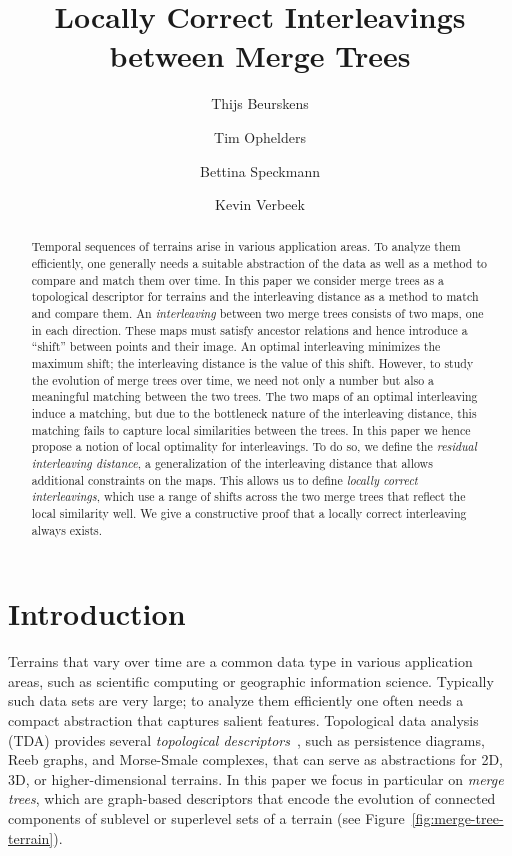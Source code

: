 \documentclass[a4paper,UKenglish, autoref, thm-restate, cleveref]{lipics-v2021}
\title{Locally Correct Interleavings between Merge Trees}
\author{Thijs Beurskens}{Department of Mathematics and Computer Science, TU Eindhoven, The Netherlands}{t.p.j.beurskens@tue.nl}{https://orcid.org/0009-0004-1185-1545}{Supported by the Dutch Research Council (NWO) under project no. OCENW.M20.089.}
\author{Tim Ophelders}{Department of Information and Computing Science, Utrecht University, The Netherlands \and Department of Mathematics and Computer Science, TU Eindhoven, The Netherlands}{t.a.e.ophelders@uu.nl}{https://orcid.org/0000-0002-9570-024X}{Supported by the Dutch Research Council (NWO) under project no. VI.Veni.212.260.}
\author{Bettina Speckmann}{Department of Mathematics and Computer Science, TU Eindhoven, The Netherlands}{b.speckmann@tue.nl}{https://orcid.org/0000-0002-8514-7858}{}
\author{Kevin Verbeek}{Department of Mathematics and Computer Science, TU Eindhoven, The Netherlands}{k.a.b.verbeek@tue.nl}{https://orcid.org/0000-0003-3052-4844}{}
\begin{document}
\maketitle

\begin{abstract}
Temporal sequences of terrains arise in various application areas. To analyze them efficiently, one generally needs a suitable abstraction of the data as well as a method to compare and match them over time. In this paper we consider merge trees as a topological descriptor for terrains and the interleaving distance as a method to match and compare them. An \emph{interleaving} between two merge trees consists of two maps, one in each direction. These maps must satisfy ancestor relations and hence introduce a ``shift'' between points and their image. An optimal interleaving minimizes the maximum shift; the interleaving distance is the value of this shift. However, to study the evolution of merge trees over time, we need not only a number but also a meaningful matching between the two trees. The two maps of an optimal interleaving induce a matching, but due to the bottleneck nature of the interleaving distance, this matching fails to capture local similarities between the trees. In this paper we hence propose a notion of local optimality for interleavings. To do so, we define the \emph{residual interleaving distance}, a generalization of the interleaving distance that allows additional constraints on the maps. This allows us to define \emph{locally correct interleavings}, which use a range of shifts across the two merge trees that reflect the local similarity well. We give a constructive proof that a locally correct interleaving always exists.
\end{abstract}

\section{Introduction}\label{sec:introduction}
Terrains that vary over time are a common data type in various application areas, such as scientific computing or geographic information science. Typically such data sets are very large; to analyze them efficiently one often needs a compact abstraction that captures salient features. Topological data analysis (TDA) provides several \emph{topological descriptors}~\cite{yan2021scalar}, such as persistence diagrams, Reeb graphs, and Morse-Smale complexes, that can serve as abstractions for 2D, 3D, or higher-dimensional terrains.
In this paper we focus in particular on \emph{merge trees}, which are graph-based descriptors that encode the evolution of connected components of sublevel or superlevel sets of a terrain (see Figure~\ref{fig:merge-tree-terrain}).
\end{document}
